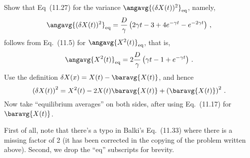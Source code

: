 

Show that Eq~(11.27) for the variance $\angavg{(\delta X(t))^2}_\text{eq}$, namely,
\begin{displaymath}
  \angavg{(\delta X(t))^2}_\text{eq} = \frac{D}{\gamma} \left(2 \gamma t - 3 + 4 e^{-\gamma t} - e^{-2\gamma t} \right)
  \, ,
\end{displaymath}
follows from Eq.~(11.5) for $\angavg{X^2(t)}_\text{eq}$, that is,
\begin{displaymath}
  \angavg{X^2(t)}_\text{eq} = 2 \frac{D}{\gamma} \left( \gamma t - 1 + e^{-\gamma t} \right)
  \, .
\end{displaymath}
Use the definition $\delta X(x) = X(t) - \baravg{X(t)}$, and hence
\begin{displaymath}
  \left( \delta X(t) \right)^2 = X^2(t) - 2 X(t) \baravg{X(t)} + \left( \baravg{X(t)} \right)^2
  \, .
\end{displaymath}
Now take ``equilibrium averages'' on both sides, after using Eq.~(11.17) for $\baravg{X(t)}$.


First of all, note that there's a typo in Balki's Eq.~(11.33) where there is a missing factor of 2 (it has been corrected in the copying of the problem written above).
Second, we drop the ``eq'' subscripts for brevity.

